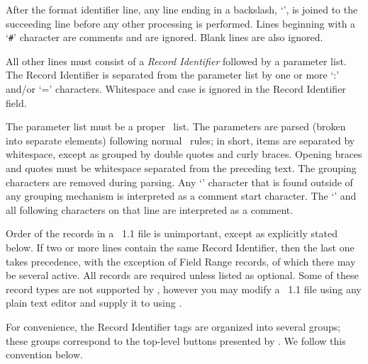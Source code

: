 After the format identifier line, any line ending in a backslash,
`\bs', is joined to the succeeding line before any other processing
is performed.  Lines beginning with a `\verb+#+' character are comments
and are ignored.  Blank lines are also ignored.

All other lines must consist of a {\em Record Identifier} followed by
a parameter list.  The Record Identifier is separated from the
parameter list by one or more `:' and/or `=' characters.  Whitespace
and case is ignored in the Record Identifier field.

The parameter list must be a proper \Tcl\ list.  The
parameters are parsed (broken into separate elements) following normal
\Tcl\ rules; in short, items are separated by whitespace, except as
grouped by double quotes and curly braces.  Opening braces and quotes
must be whitespace separated from the preceding text.  The grouping
characters are removed during parsing.  Any `\lb' character that is
found outside of any grouping mechanism is interpreted as a comment
start character.  The `\lb' and all following characters on that line
are interpreted as a comment.

Order of the records in a \MIF~1.1 file is unimportant, except as
explicitly stated below.  If two or more lines contain the same Record
Identifier, then the last one takes precedence,
with the exception of Field Range records, of which there may be several
active.  All records are required unless listed as optional.  Some of
these record types are not supported by , however you
may modify a \MIF~1.1 file using any plain text editor and supply it to
using 
.

For convenience, the Record Identifier tags are organized into several
groups; these groups correspond to the top-level buttons presented by
.  We follow this convention below.

